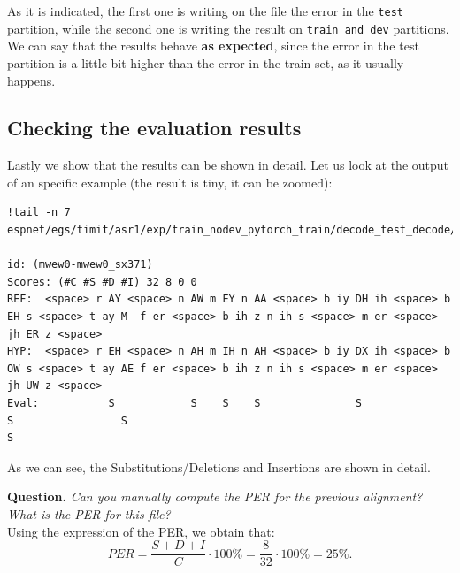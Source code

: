 \documentclass[a4paper]{article}
\def\inline{\lstinline[basicstyle=\ttfamily,keywordstyle={}]}
\begin{document}
As it is indicated, the first one is writing on the file the error in the \inline{test} partition, while the second one is writing the result on \inline{train and dev} partitions. We can say that the results behave \textbf{as expected}, since the error in the test partition is a little bit higher than the error in the train set, as it usually happens.
\subsection{Checking the evaluation results}

Lastly we show that the results can be shown in detail. Let us look at the output of an specific example (the result is tiny, it can be zoomed):

\begin{verbatim}
!tail -n 7 espnet/egs/timit/asr1/exp/train_nodev_pytorch_train/decode_test_decode/result.txt
---
id: (mwew0-mwew0_sx371)
Scores: (#C #S #D #I) 32 8 0 0
REF:  <space> r AY <space> n AW m EY n AA <space> b iy DH ih <space> b EH s <space> t ay M  f er <space> b ih z n ih s <space> m er <space> jh ER z <space>
HYP:  <space> r EH <space> n AH m IH n AH <space> b iy DX ih <space> b OW s <space> t ay AE f er <space> b ih z n ih s <space> m er <space> jh UW z <space>
Eval:           S            S    S    S               S               S                 S                                                     S
\end{verbatim}
As we can see, the Substitutions/Deletions and Insertions are shown in detail.



\textbf{Question.} \emph{Can you manually compute the PER for the previous alignment? What is the PER for this file?}\\
Using the expression of the PER, we obtain that:
\[
  PER = \frac{S+D+I}{C}\cdot 100\% = \frac{8}{32} \cdot 100\% = 25\%.
\]

\printbibliography
\end{document}

